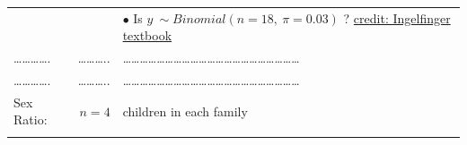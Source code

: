 \documentclass[]{book}
\begin{document}
\begin{longtable}[]{@{}lrl@{}}
\begin{minipage}[t]{0.60\columnwidth}
\strut
\end{minipage} & \begin{minipage}[t]{0.16\columnwidth}\raggedleft
\strut
\end{minipage} & \begin{minipage}[t]{0.16\columnwidth}\raggedright
\(\bullet\) Is \(y ~ \sim Binomial(n=18, \ \pi=0.03)\) ? \href{https://www.amazon.ca/Biostatistics-Clinical-Medicine-Joseph-Ingelfinger/dp/0023597216}{credit: Ingelfinger textbook}\strut
\end{minipage}\tabularnewline
\begin{minipage}[t]{0.60\columnwidth}\raggedright
\ldots{}\ldots{}\ldots{}\ldots{}.\strut
\end{minipage} & \begin{minipage}[t]{0.16\columnwidth}\raggedleft
\ldots{}\ldots{}\ldots{}..\strut
\end{minipage} & \begin{minipage}[t]{0.16\columnwidth}\raggedright
\ldots{}\ldots{}\ldots{}\ldots{}\ldots{}\ldots{}\ldots{}\ldots{}\ldots{}\ldots{}\ldots{}\ldots{}\ldots{}\ldots{}\ldots{}\ldots{}\ldots{}\ldots{}\ldots{}\ldots{}\ldots{}\strut
\end{minipage}\tabularnewline
\begin{minipage}[t]{0.60\columnwidth}\raggedright
\ldots{}\ldots{}\ldots{}\ldots{}.\strut
\end{minipage} & \begin{minipage}[t]{0.16\columnwidth}\raggedleft
\ldots{}\ldots{}\ldots{}..\strut
\end{minipage} & \begin{minipage}[t]{0.16\columnwidth}\raggedright
\ldots{}\ldots{}\ldots{}\ldots{}\ldots{}\ldots{}\ldots{}\ldots{}\ldots{}\ldots{}\ldots{}\ldots{}\ldots{}\ldots{}\ldots{}\ldots{}\ldots{}\ldots{}\ldots{}\ldots{}\ldots{}\strut
\end{minipage}\tabularnewline
\begin{minipage}[t]{0.60\columnwidth}\raggedright
Sex Ratio:\strut
\end{minipage} & \begin{minipage}[t]{0.16\columnwidth}\raggedleft
\(n=4\)\strut
\end{minipage} & \begin{minipage}[t]{0.16\columnwidth}\raggedright
children in each family\strut
\end{minipage}\tabularnewline
\begin{minipage}[t]{0.60\columnwidth}\raggedright
\strut
\end{minipage} & \begin{minipage}[t]{0.16\columnwidth}\raggedleft

\end{minipage}
\end{longtable}
\end{document}
